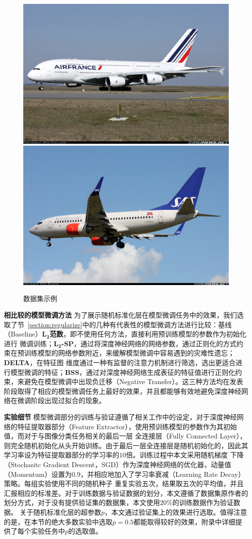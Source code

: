 \begin{figure}
{    \includegraphics[width=0.3\linewidth]{figures/air/2.jpg}
    \includegraphics[width=0.3\linewidth]{figures/air/3.jpg}
  }
  \caption{数据集示例}
  \label{fig:datasets}
\end{figure}


\textbf{相比较的模型微调方法 } 为了展示随机标准化层在模型微调任务中的效果，我们选取了节~\ref{section:regularize}中的几种有代表性的模型微调方法进行比较：基线（Baseline）\textbf{$\bm{L_2}$范数}，即不使用任何方法，直接利用预训练模型的参数作为初始化进行
微调训练；\textbf{$\bm{L_2}$-SP}\citep{xuhong2018explicit}，通过将深度神经网络的网络参数，通过正则化的方式约束在预训练模型的网络参数附近，来缓解模型微调中容易遇到的灾难性遗忘；\textbf{DELTA}\citep{li2018delta}，在特征图
维度通过一种有监督的注意力机制进行筛选，选出更适合进行模型微调的特征；\textbf{BSS}\citep{chen2019catastrophic}，通过对深度神经网络生成表征的特征值进行正则化约束，来避免在模型微调中出现负迁移（Negative Transfer）。这三种方法均在发表
阶段取得了相应的模型微调任务上最好的效果，并且都能够有效地避免深度神经网络在微调阶段出现过拟合的现象。

\textbf{实验细节 } 模型微调部分的训练与验证遵循了相关工作\citep{xuhong2018explicit,li2018delta,chen2019catastrophic}中的设定，对于深度神经网络的特征提取器部分（Feature Extractor），使用预训练模型的参数作为其初始值，而对于与图像分类任务相关的最后一层
全连接层（Fully Connected Layer），则完全随机初始化从头开始训练。由于最后一层全连接层是随机初始化的，因此其学习率设为特征提取器部分的学习率的$10$倍。训练过程中本文采用随机梯度
下降（Stochasitc Gradient Descent，SGD）作为深度神经网络的优化器，动量值（Momentum）设置为$0.9$，并相应地加入了学习率衰减（Learning Rate Decay）策略。每组实验使用不同的随机种子
重复实验五次，结果取五次的平均值，并且汇报相应的标准差。对于训练数据与验证数据的划分，本文遵循了数据集原作者的划分方式，对于没有提供验证集的数据集，本文使用$20\%$的训练数据作为验证数据。
关于随机标准化层的超参数$p$，本文通过验证集上的效果进行选取。值得注意的是，在本节的绝大多数实验中选取$p=0.5$都能取得较好的效果，附录中详细提供了每个实验任务中$p$的选取值。


